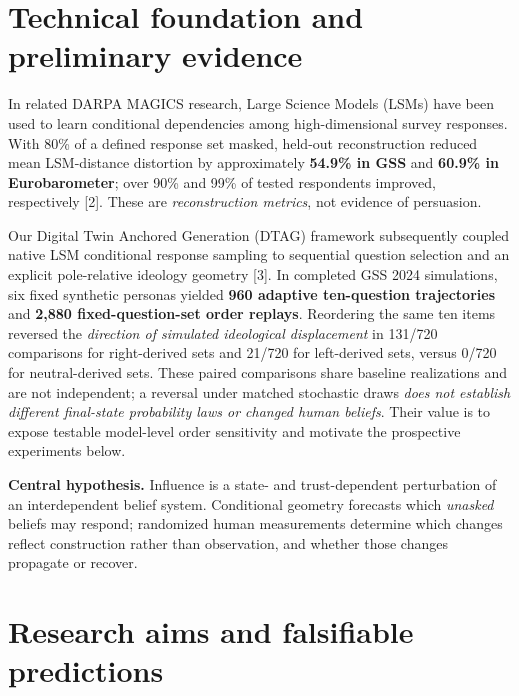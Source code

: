 \documentclass[10pt,letterpaper]{article}
\begin{document}
\section*{Technical foundation and preliminary evidence}
In related DARPA MAGICS research, Large Science Models (LSMs) have been used to learn conditional dependencies among high-dimensional survey responses. With 80\% of a defined response set masked, held-out reconstruction reduced mean LSM-distance distortion by approximately \textbf{54.9\% in GSS} and \textbf{60.9\% in Eurobarometer}; over 90\% and 99\% of tested respondents improved, respectively [2]. These are \emph{reconstruction metrics}, not evidence of persuasion.

Our Digital Twin Anchored Generation (DTAG) framework subsequently coupled native LSM conditional response sampling to sequential question selection and an explicit pole-relative ideology geometry [3]. In completed GSS 2024 simulations, six fixed synthetic personas yielded \textbf{960 adaptive ten-question trajectories} and \textbf{2,880 fixed-question-set order replays}. Reordering the same ten items reversed the \emph{direction of simulated ideological displacement} in 131/720 comparisons for right-derived sets and 21/720 for left-derived sets, versus 0/720 for neutral-derived sets. These paired comparisons share baseline realizations and are not independent; a reversal under matched stochastic draws \emph{does not establish different final-state probability laws or changed human beliefs}. Their value is to expose testable model-level order sensitivity and motivate the prospective experiments below.

\vspace{3pt}
\noindent\colorbox{light}{\parbox{\dimexpr\linewidth-2\fboxsep\relax}{\vspace{3pt}\small\color{ink}\textbf{Central hypothesis.} Influence is a state- and trust-dependent perturbation of an interdependent belief system. Conditional geometry forecasts which \emph{unasked} beliefs may respond; randomized human measurements determine which changes reflect construction rather than observation, and whether those changes propagate or recover.\vspace{3pt}}}

\newpage
\section*{Research aims and falsifiable predictions}
\end{document}
